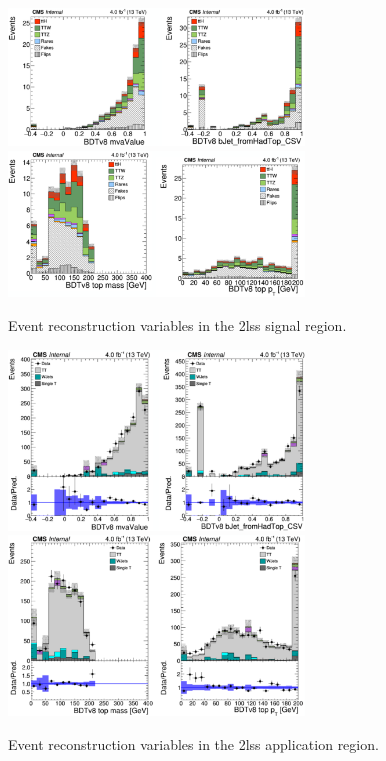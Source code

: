 \begin{figure}[htb]
 \centering
   \includegraphics[width=0.7\textwidth]{plots_reconstruction/reconstruction_mva_csv_signal_region.png}
   \includegraphics[width=0.7\textwidth]{plots_reconstruction/reconstruction_topmass_toppt_signal_region.png}
   \caption{Event reconstruction variables in the 2lss signal region.}
  \label{reconstruction:vars_signal_region}
\end{figure}

\begin{figure}[htb]
 \centering
   \includegraphics[width=0.7\textwidth]{plots_reconstruction/reconstruction_mva_csv_application_region.png}
   \includegraphics[width=0.7\textwidth]{plots_reconstruction/reconstruction_topmass_toppt_application_region.png}
   \caption{Event reconstruction variables in the 2lss application region.}
  \label{reconstruction:vars_application_region}
\end{figure}

